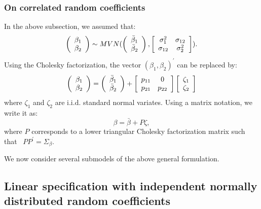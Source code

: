\documentclass[12pt]{memoir}
\begin{document}
\subsubsection{On correlated random coefficients}

In the above subsection, we assumed that:%
\[
\left(
\begin{array}
[c]{c}%
\beta_{1}\\
\beta_{2}%
\end{array}
\right)  \sim MVN(\left(
\begin{array}
[c]{c}%
\bar{\beta}_{1}\\
\bar{\beta}_{2}%
\end{array}
\right)  ,\left[
\begin{array}
[c]{cc}%
\sigma_{1}^{2} & \sigma_{12}\\
\sigma_{12} & \sigma_{2}^{2}%
\end{array}
\right]  ).
\]
Using the Cholesky factorization, the vector $(\beta_{1},\beta_{2})^{\prime}$
can be replaced by:%
\begin{equation}
\left(
\begin{array}
[c]{c}%
\beta_{1}\\
\beta_{2}%
\end{array}
\right)  =\left(
\begin{array}
[c]{c}%
\bar{\beta}_{1}\\
\bar{\beta}_{2}%
\end{array}
\right)  +\left[
\begin{array}
[c]{cc}%
p_{11} & 0\\
p_{21} & p_{22}%
\end{array}
\right]  \left[
\begin{array}
[c]{c}%
\zeta_{1}\\
\zeta_{2}%
\end{array}
\right]  \label{Cholesky 1}%
\end{equation}
where $\zeta_{1}$ and $\zeta_{2}$ are i.i.d. standard normal variates. Using a
matrix notation, we write it as:%
\begin{equation}
\beta=\bar{\beta}+P\zeta, \label{Cholesky 2}%
\end{equation}
where $P$ corresponds to a lower triangular Cholesky factorization matrix such
that \ $PP^{\prime}=\Sigma_{\beta}.$

We now consider several submodels of the above general formulation.

\subsection{Linear specification with independent normally distributed random
coefficients}
\end{document}
